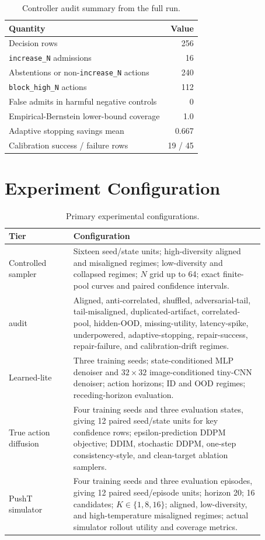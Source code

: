 \begin{table}[h]
\caption{Controller audit summary from the full run.}
\label{tab:controller-full}
\centering
\small
\begin{tabular}{lr}
\toprule
Quantity & Value \\
\midrule
Decision rows & 256 \\
\texttt{increase\_N} admissions & 16 \\
Abstentions or non-\texttt{increase\_N} actions & 240 \\
\texttt{block\_high\_N} actions & 112 \\
False admits in harmful negative controls & 0 \\
Empirical-Bernstein lower-bound coverage & 1.0 \\
Adaptive stopping savings mean & 0.667 \\
Calibration success / failure rows & 19 / 45 \\
\bottomrule
\end{tabular}
\end{table}

\section{Experiment Configuration}
\label{app:configs}

\begin{table}[h]
\caption{Primary experimental configurations.}
\label{tab:configs}
\centering
\small
\begin{tabular}{@{}p{0.22\linewidth}p{0.65\linewidth}@{}}
\toprule
Tier & Configuration \\
\midrule
Controlled sampler & Sixteen seed/state units; high-diversity aligned and misaligned regimes; low-diversity and collapsed regimes; $N$ grid up to 64; exact finite-pool curves and paired confidence intervals. \\
\ats{} audit & Aligned, anti-correlated, shuffled, adversarial-tail, tail-misaligned, duplicated-artifact, correlated-pool, hidden-OOD, missing-utility, latency-spike, underpowered, adaptive-stopping, repair-success, repair-failure, and calibration-drift regimes. \\
Learned-lite & Three training seeds; state-conditioned MLP denoiser and $32{\times}32$ image-conditioned tiny-CNN denoiser; action horizons; ID and OOD regimes; receding-horizon evaluation. \\
True action diffusion & Four training seeds and three evaluation states, giving 12 paired seed/state units for key confidence rows; epsilon-prediction DDPM objective; DDIM, stochastic DDPM, one-step consistency-style, and clean-target ablation samplers. \\
PushT simulator & Four training seeds and three evaluation episodes, giving 12 paired seed/episode units; horizon 20; 16 candidates; $K\in\{1,8,16\}$; aligned, low-diversity, and high-temperature misaligned regimes; actual simulator rollout utility and coverage metrics. \\
\bottomrule
\end{tabular}
\end{table}

